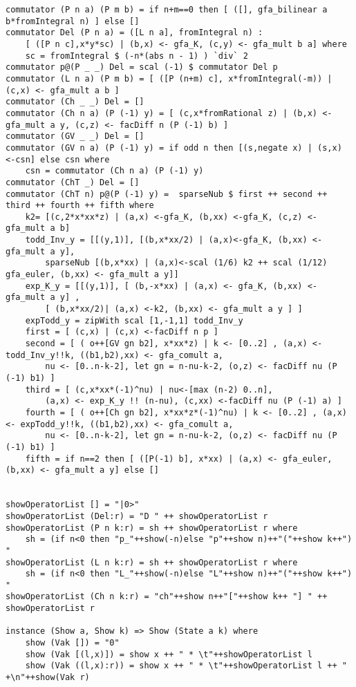 \begin{lstlisting}
commutator (P n a) (P m b) = if n+m==0 then [ ([], gfa_bilinear a b*fromIntegral n) ] else []
commutator Del (P n a) = ([L n a], fromIntegral n) : 
	[ ([P n c],x*y*sc) | (b,x) <- gfa_K, (c,y) <- gfa_mult b a] where
	sc = fromIntegral $ (-n*(abs n - 1) ) `div` 2
commutator p@(P _ _) Del = scal (-1) $ commutator Del p
commutator (L n a) (P m b) = [ ([P (n+m) c], x*fromIntegral(-m)) | (c,x) <- gfa_mult a b ]
commutator (Ch _ _) Del = []
commutator (Ch n a) (P (-1) y) = [ (c,x*fromRational z) | (b,x) <- gfa_mult a y, (c,z) <- facDiff n (P (-1) b) ]
commutator (GV _ _) Del = []
commutator (GV n a) (P (-1) y) = if odd n then [(s,negate x) | (s,x) <-csn] else csn where
	csn = commutator (Ch n a) (P (-1) y) 
commutator (ChT _) Del = []
commutator (ChT n) p@(P (-1) y) =  sparseNub $ first ++ second ++ third ++ fourth ++ fifth where
	k2= [(c,2*x*xx*z) | (a,x) <-gfa_K, (b,xx) <-gfa_K, (c,z) <- gfa_mult a b]
	todd_Inv_y = [[(y,1)], [(b,x*xx/2) | (a,x)<-gfa_K, (b,xx) <- gfa_mult a y],  
		sparseNub [(b,x*xx) | (a,x)<-scal (1/6) k2 ++ scal (1/12) gfa_euler, (b,xx) <- gfa_mult a y]]
	exp_K_y = [[(y,1)], [ (b,-x*xx) | (a,x) <- gfa_K, (b,xx) <- gfa_mult a y] ,
		[ (b,x*xx/2)| (a,x) <-k2, (b,xx) <- gfa_mult a y ] ]
	expTodd_y = zipWith scal [1,-1,1] todd_Inv_y
	first = [ (c,x) | (c,x) <-facDiff n p ]
	second = [ ( o++[GV gn b2], x*xx*z) | k <- [0..2] , (a,x) <- todd_Inv_y!!k, ((b1,b2),xx) <- gfa_comult a, 
		nu <- [0..n-k-2], let gn = n-nu-k-2, (o,z) <- facDiff nu (P (-1) b1) ]
	third = [ (c,x*xx*(-1)^nu) | nu<-[max (n-2) 0..n], 
		(a,x) <- exp_K_y !! (n-nu), (c,xx) <-facDiff nu (P (-1) a) ]
	fourth = [ ( o++[Ch gn b2], x*xx*z*(-1)^nu) | k <- [0..2] , (a,x) <- expTodd_y!!k, ((b1,b2),xx) <- gfa_comult a, 
		nu <- [0..n-k-2], let gn = n-nu-k-2, (o,z) <- facDiff nu (P (-1) b1) ]
	fifth = if n==2 then [ ([P(-1) b], x*xx) | (a,x) <- gfa_euler, (b,xx) <- gfa_mult a y] else []


showOperatorList [] = "|0>"
showOperatorList (Del:r) = "D " ++ showOperatorList r
showOperatorList (P n k:r) = sh ++ showOperatorList r where
	sh = (if n<0 then "p_"++show(-n)else "p"++show n)++"("++show k++") "
showOperatorList (L n k:r) = sh ++ showOperatorList r where
	sh = (if n<0 then "L_"++show(-n)else "L"++show n)++"("++show k++") "
showOperatorList (Ch n k:r) = "ch"++show n++"["++show k++ "] " ++ showOperatorList r 

instance (Show a, Show k) => Show (State a k) where
	show (Vak []) = "0"
	show (Vak [(l,x)]) = show x ++ " * \t"++showOperatorList l
	show (Vak ((l,x):r)) = show x ++ " * \t"++showOperatorList l ++ " +\n"++show(Vak r) 




\end{lstlisting}
